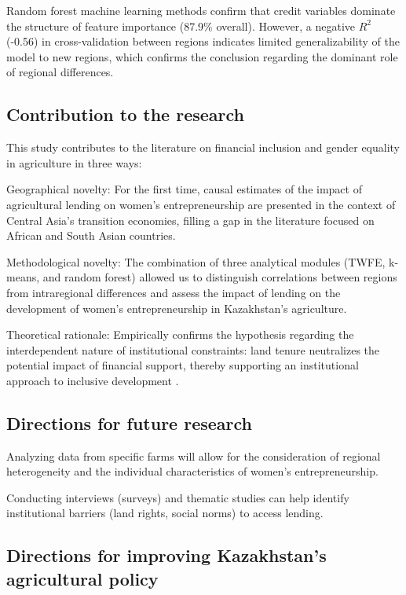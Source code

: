 ﻿\documentclass[pdflatex,sn-mathphys-ay]{sn-jnl}
\begin{document}
Random forest machine learning methods confirm that credit variables
dominate the structure of feature importance (87.9\% overall). However,
a negative $R^2$ (-0.56) in cross-validation between regions indicates
limited generalizability of the model to new regions, which confirms the
conclusion regarding the dominant role of regional differences.

\subsection{Contribution to the research}

This study contributes to the literature on financial inclusion and
gender equality in agriculture in three ways:

Geographical novelty: For the first time, causal estimates of the impact
of agricultural lending on women's entrepreneurship are presented in the
context of Central Asia's transition economies, filling a gap in the
literature focused on African and South Asian countries.

Methodological novelty: The combination of three analytical modules
(TWFE, k-means, and random forest) allowed us to distinguish
correlations between regions from intraregional differences and assess
the impact of lending on the development of women's entrepreneurship in
Kazakhstan's agriculture.

Theoretical rationale: Empirically confirms the hypothesis regarding the
interdependent nature of institutional constraints: land tenure
neutralizes the potential impact of financial support, thereby
supporting an institutional approach to inclusive development
\citep{ref78,ref90}.

\subsection{Directions for future research}

Analyzing data from specific farms will allow for the consideration of
regional heterogeneity and the individual characteristics of women's
entrepreneurship.

Conducting interviews (surveys) and thematic studies can help identify
institutional barriers (land rights, social norms) to access lending.

\subsection{Directions for improving Kazakhstan's agricultural policy}
\end{document}
